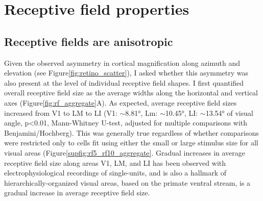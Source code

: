 \section{Receptive field properties}
\subsection{Receptive fields are anisotropic}
Given the observed asymmetry in cortical magnification along azimuth and elevation (see Figure\ref{fig:retino_scatter}), I asked whether this asymmetry was also present at the level of individual receptive field shapes. I first quantified overall receptive field size as the average widths along the horizontal and vertical axes (Figure\ref{fig:rf_aggregate}A). As expected, average receptive field sizes increased from V1 to LM to LI (V1: $\sim$\ang{8.81}, Lm: $\sim$\ang{10.45}, LI: $\sim$\ang{13.54} of visual angle, p<0.01, Mann-Whitney U-test, adjusted for multiple comparisons with Benjamini/Hochberg). This was generally true regardless of whether comparisons were restricted only to cells fit using either the small or large stimulus size for all visual areas (Figure\ref{supfig:rf5_rf10_aggregate}. Gradual increases in average receptive field size along areas V1, LM, and LI has been observed with electrophysiological recordings of single-units\cite{Vermaercke2014, Tafazoli2017}, and is also a hallmark of hierarchically-organized visual areas, based on the primate ventral stream, is a gradual increase in average receptive field size\cite{Rust2010SelectivityIT, Vermaercke2014, Siegle2021, Tafazoli2017}.


